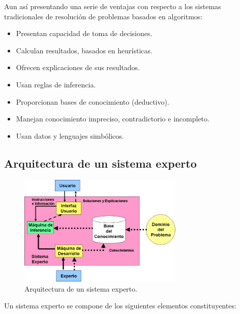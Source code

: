 \documentclass[a4paper, 11pt, titlepage]{article}
\begin{document}
    Aun así presentando una serie de ventajas con respecto a los sistemas tradicionales de 
    resolución de problemas basados en algoritmos:

    \begin{itemize}
        \item Presentan capacidad de toma de decisiones.
        \item Calculan resultados, basados en heurísticas.
        \item Ofrecen explicaciones de sus resultados.
        \item Usan reglas de inferencia.
        \item Proporcionan bases de conocimiento (deductivo).
        \item Manejan conocimiento impreciso, contradictorio e incompleto.
        \item Usan datos y lenguajes simbólicos.
    \end{itemize}

    \subsection{Arquitectura de un sistema experto}

        \begin{figure}[htp]
            \centering
            \includegraphics[width=0.7\textwidth]{resources/sistemaexperto.jpg}
            \caption{Arquitectura de un sistema experto.}
            \label{sistemaexperto}
        \end{figure}

        Un sistema experto se compone de los siguientes elementos constituyentes:
\end{document}
